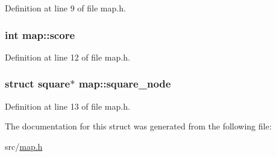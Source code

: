 Definition at line 9 of file map.\-h.

\hypertarget{structmap_a95a5a344dda519e69d1a8ae730bfbc02}{
\subsubsection[{score}]{\setlength{\rightskip}{0pt plus 5cm}int map\-::score}}\label{structmap_a95a5a344dda519e69d1a8ae730bfbc02}


Definition at line 12 of file map.\-h.

\hypertarget{structmap_a5c8b324a106c3de305b6427292627d80}{
\subsubsection[{square\-\_\-node}]{\setlength{\rightskip}{0pt plus 5cm}struct {\bf square}$\ast$ map\-::square\-\_\-node}}\label{structmap_a5c8b324a106c3de305b6427292627d80}


Definition at line 13 of file map.\-h.



The documentation for this struct was generated from the following file\-:\begin{DoxyCompactItemize}
\item 
src/\hyperlink{map_8h}{map.\-h}\end{DoxyCompactItemize}
